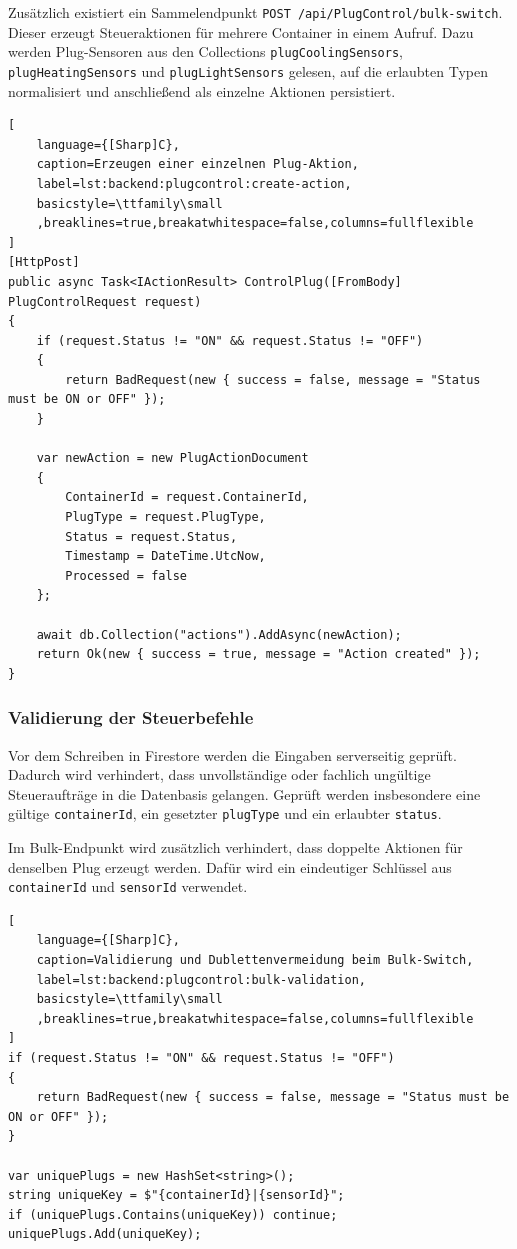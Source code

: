 Zusätzlich existiert ein Sammelendpunkt \texttt{POST /api/PlugControl/bulk-switch}. Dieser erzeugt Steueraktionen für mehrere Container in einem Aufruf. Dazu werden Plug-Sensoren aus den Collections \texttt{plugCoolingSensors}, \texttt{plugHeatingSensors} und \texttt{plugLightSensors} gelesen, auf die erlaubten Typen normalisiert und anschließend als einzelne Aktionen persistiert.

\begin{lstlisting}[
    language={[Sharp]C},
    caption=Erzeugen einer einzelnen Plug-Aktion,
    label=lst:backend:plugcontrol:create-action,
    basicstyle=\ttfamily\small
    ,breaklines=true,breakatwhitespace=false,columns=fullflexible
]
[HttpPost]
public async Task<IActionResult> ControlPlug([FromBody] PlugControlRequest request)
{
    if (request.Status != "ON" && request.Status != "OFF")
    {
        return BadRequest(new { success = false, message = "Status must be ON or OFF" });
    }

    var newAction = new PlugActionDocument
    {
        ContainerId = request.ContainerId,
        PlugType = request.PlugType,
        Status = request.Status,
        Timestamp = DateTime.UtcNow,
        Processed = false
    };

    await db.Collection("actions").AddAsync(newAction);
    return Ok(new { success = true, message = "Action created" });
}
\end{lstlisting}

\subsubsection{Validierung der Steuerbefehle}

Vor dem Schreiben in Firestore werden die Eingaben serverseitig geprüft. Dadurch wird verhindert, dass unvollständige oder fachlich ungültige Steueraufträge in die Datenbasis gelangen. Geprüft werden insbesondere eine gültige \texttt{containerId}, ein gesetzter \texttt{plugType} und ein erlaubter \texttt{status}.

Im Bulk-Endpunkt wird zusätzlich verhindert, dass doppelte Aktionen für denselben Plug erzeugt werden. Dafür wird ein eindeutiger Schlüssel aus \texttt{containerId} und \texttt{sensorId} verwendet.

\begin{lstlisting}[
    language={[Sharp]C},
    caption=Validierung und Dublettenvermeidung beim Bulk-Switch,
    label=lst:backend:plugcontrol:bulk-validation,
    basicstyle=\ttfamily\small
    ,breaklines=true,breakatwhitespace=false,columns=fullflexible
]
if (request.Status != "ON" && request.Status != "OFF")
{
    return BadRequest(new { success = false, message = "Status must be ON or OFF" });
}

var uniquePlugs = new HashSet<string>();
string uniqueKey = $"{containerId}|{sensorId}";
if (uniquePlugs.Contains(uniqueKey)) continue;
uniquePlugs.Add(uniqueKey);
\end{lstlisting}

